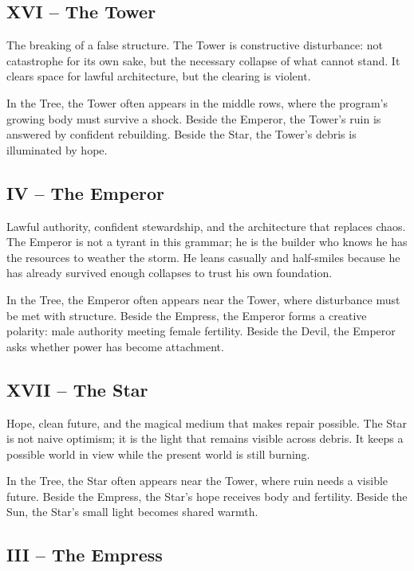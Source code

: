 \subsection{XVI -- The Tower}

The breaking of a false structure. The Tower is constructive disturbance: not
catastrophe for its own sake, but the necessary collapse of what cannot stand.
It clears space for lawful architecture, but the clearing is violent.

In the Tree, the Tower often appears in the middle rows, where the program's
growing body must survive a shock. Beside the Emperor, the Tower's ruin is
answered by confident rebuilding. Beside the Star, the Tower's debris is
illuminated by hope.

\subsection{IV -- The Emperor}

Lawful authority, confident stewardship, and the architecture that replaces
chaos. The Emperor is not a tyrant in this grammar; he is the builder who knows
he has the resources to weather the storm. He leans casually and half-smiles
because he has already survived enough collapses to trust his own foundation.

In the Tree, the Emperor often appears near the Tower, where disturbance must be
met with structure. Beside the Empress, the Emperor forms a creative polarity:
male authority meeting female fertility. Beside the Devil, the Emperor asks
whether power has become attachment.

\subsection{XVII -- The Star}

Hope, clean future, and the magical medium that makes repair possible. The Star
is not naive optimism; it is the light that remains visible across debris. It
keeps a possible world in view while the present world is still burning.

In the Tree, the Star often appears near the Tower, where ruin needs a
visible future. Beside the Empress, the Star's hope receives body and fertility.
Beside the Sun, the Star's small light becomes shared warmth.

\subsection{III -- The Empress}

